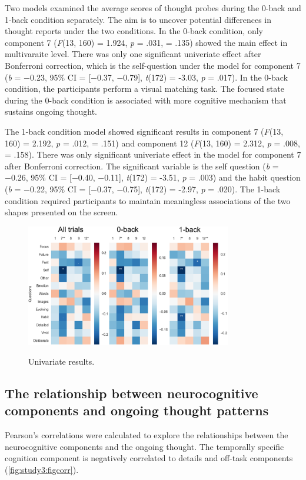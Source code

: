 Two models examined the average scores of thought probes during the 0-back and 1-back condition separately.  The aim is to uncover potential differences in thought reports under the two conditions. In the 0-back condition, only component 7
(\textit{F}(13, 160) = 1.924, \textit{p} = .031, \paretasquared = .135)
showed the main effect in multivaraite level. There was only one significant univeriate effect after Bonferroni correction, which is the self-question under the model for component 7 
(\textit{b} = −0.23, 95\% CI = [−0.37, −0.79], \textit{t}(172) = -3.03, \textit{p} = .017).
In the 0-back condition, the participants perform a visual matching task. The focused state during the 0-back condition is associated with more cognitive mechanism that sustains ongoing thought. 

The 1-back condition model showed significant results in
component 7
(\textit{F}(13, 160) = 2.192, \textit{p} = .012, \paretasquared = .151)
and component 12
(\textit{F}(13, 160) = 2.312, \textit{p} = .008, \paretasquared = .158). There was only significant univeriate effect in the model for component 7 after Bonferroni correction.
The significant variable is the self question
(\textit{b} = −0.26, 95\% CI = [−0.40, −0.11], \textit{t}(172) = -3.51, \textit{p} = .003)
and the habit question
(\textit{b} = −0.22, 95\% CI = [−0.37, −0.75], \textit{t}(172) = -2.97, \textit{p} = .020).
The 1-back condition required participants to maintain meaningless associations of the two shapes presented on the screen.

\begin{figure}[H]
    \centering
    \includegraphics[width=0.8\textwidth]{study3/image/study3fig4.png}
    \caption{Univariate results.}
    \caption*{
    \footnotesize{
    }
    }
    \label{fig:study3:fig4}
\end{figure}


\subsection{The relationship between neurocognitive components and ongoing thought patterns}
Pearson's correlations were calculated to explore the relationships between the neurocognitive components and the ongoing thought. The temporally specific cognition component is negatively correlated to details and off-task components (\cref{fig:study3:figcorr}). 

